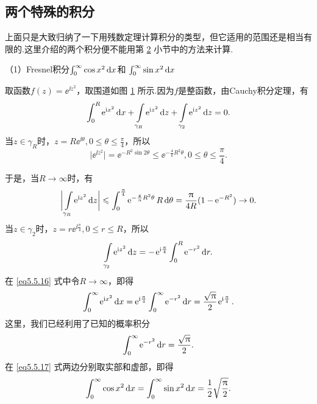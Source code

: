 \subsection{两个特殊的积分}
上面只是大致归纳了一下用残数定理计算积分的类型，但它适用的范围还是相当有限的.这里介绍的两个积分便不能用第 \hyperlink{sec5.5.2}{2} 小节中的方法来计算.

（1）{\kaishu Fresnel积分$\int_0^\infty\cos x^2\mathop{}\!\mathrm dx$和
$\int_0^\infty\sin x^2\mathop{}\!\mathrm dx$}

取函数$f(z)=\ee^{\ii z^2}$，取围道如图 \ref{fig5.7} 所示.因为$f$是整函数，由Cauchy积分定理，有
\begin{equation}\label{eq5.5.16}
  \int_0^R\ee^{\ii x^2}\dx+\int\limits_{\gamma_R}\ee^{\ii z^2}\dz+\int\limits_{\gamma_2}\ee^{\ii z^2}\dz=0.
\end{equation}
当$z\in\gamma_R$时，$z=R\ee^{\ii\theta},0\le\theta\le\frac\pi4$，所以
\[
  \big|\ee^{\ii z^2}\big| = \ee^{-R^2\sin2\theta}\le\ee^{-\frac4\pi R^2\theta},0\le\theta\le\frac\pi4.
\]
\begin{figure}[!ht]
  \centering
  \caption{\label{fig5.7}}
\end{figure}
于是，当$R\to\infty$时，有
\[
  \bigg|\int\limits_{\gamma_R}\ee^{\ii z^2}\dz\bigg|
  \le\int_0^{\frac\pi4}\ee^{-\frac4\pi R^2\theta}R\dif \theta
  = \frac\pi{4R}(1-\ee^{-R^2})\to0.
\]
当$z\in\gamma_2$时，$z=r\ee^{\ii\frac\pi4},0\le r\le R$，所以
\[
  \int\limits_{\gamma_2}\ee^{\ii z^2}\dz = -\ee^{\ii\frac\pi4}\int_0^R\ee^{-r^2}\dif r.
\]
在 \eqref{eq5.5.16} 式中令$R\to\infty$，即得
\begin{equation}\label{eq5.5.17}
  \int_0^\infty\ee^{\ii x^2}\dx=\ee^{\ii\frac\pi4}\int_0^\infty\ee^{-r^2}\dif r
  =\frac{\sqrt\pi}2\ee^{\ii\frac\pi4}.
\end{equation}
这里，我们已经利用了已知的概率积分
\[
  \int_0^\infty\operatorname{\!\!\;\mathrm e}^{-r^2}\mathop{}\!\mathrm{d} r = \frac{\sqrt{\uppi}}2.
\]
在 \eqref{eq5.5.17} 式两边分别取实部和虚部，即得
\[
  \int_0^\infty\cos x^2\mathop{}\!\mathrm dx = \int_0^\infty\sin x^2\mathop{}\!\mathrm dx = \frac12\sqrt{\frac{\uppi}2}.
\]


